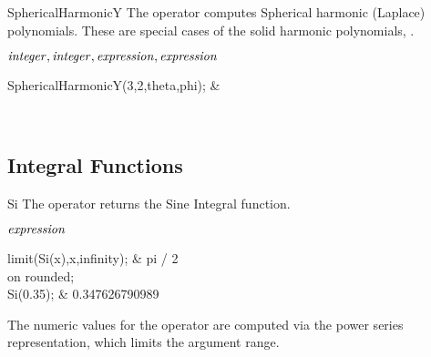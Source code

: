 \begin{Operator}{SphericalHarmonicY}
The  operator computes Spherical harmonic (Laplace)
polynomials. These are special cases of the
solid harmonic polynomials, .

\begin{Syntax}

\(\meta{integer},\meta{integer},
\meta{expression},\meta{expression}\)

\end{Syntax}

\begin{Examples}
SphericalHarmonicY(3,2,theta,phi); &
 
\\

\end{Examples}

\end{Operator}


\subsection{Integral Functions}
\begin{Operator}{Si}
The  operator returns the Sine Integral function.

\begin{Syntax}
\(\meta{expression}\)
\end{Syntax}

\begin{Examples}
limit(Si(x),x,infinity);          &       pi / 2 \\
on rounded; \\
Si(0.35);                         &       0.347626790989
\end{Examples}

\begin{Comments}
The numeric values for the operator  are computed via the
power series representation, which limits the argument range.
\end{Comments}
\end{Operator}

